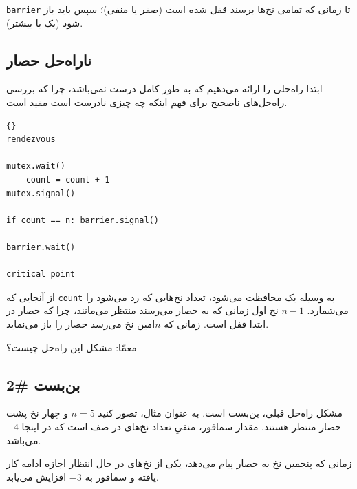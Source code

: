 \documentclass{book}
\newcommand{\clearemptydoublepage}{\newpage\cleardoublepage}
\begin{document}
    \texttt{barrier}
    تا زمانی که تمامی نخ‌ها برسند قفل شده است (صفر یا منفی)؛ سپس باید باز شود (یک یا بیشتر). 

\clearemptydoublepage
\subsection 
{ناراه‌حل حصار}

    ابتدا راه‌حلی را ارائه می‌دهیم که به طور کامل درست نمی‌باشد، چرا که بررسی راه‌حل‌های ناصحیح برای فهم اینکه چه چیزی نادرست است مفید است.

\begin{latin}
\begin{lstlisting}[title=\rl{ناراه‌حل حصار}]{}
rendezvous

mutex.wait()
    count = count + 1
mutex.signal()

if count == n: barrier.signal()

barrier.wait()

critical point
\end{lstlisting}
\end{latin}

     از آنجایی که \texttt{count} به وسیله یک  محافظت می‌شود، تعداد نخ‌هایی که رد می‌شود را می‌شمارد. $n-1$ 
     نخ اول زمانی که به حصار می‌رسند منتظر می‌مانند، چرا که حصار در ابتدا قفل است. زمانی که $n$امین نخ می‌رسد حصار را باز می‌نماید. 
     
    معمّا: مشکل این راه‌حل چیست؟
    
\clearemptydoublepage
\subsection{بن‌بست \#2}

    مشکل راه‌حل قبلی، بن‌بست است.
    به عنوان مثال، تصور کنید $n=5$ و چهار نخ پشت حصار منتظر هستند. مقدار سمافور، منفیِ تعداد نخ‌های در صف است که در اینجا $-4$ می‌باشد. 
    
    زمانی که پنجمین نخ به حصار پیام می‌دهد، یکی از نخ‌های در حال انتظار اجازه ادامه کار یافته و سمافور به $-3$ افزایش می‌یابد. 
    
\end{document}
